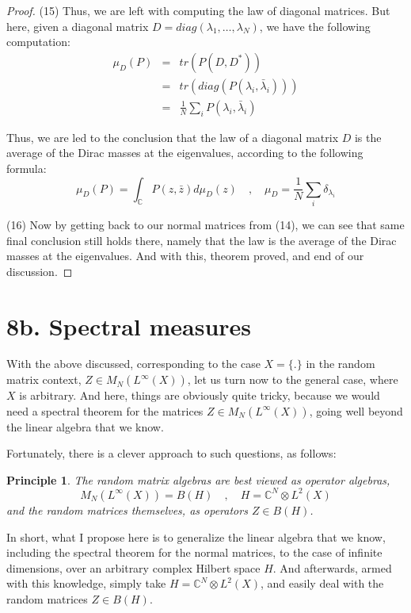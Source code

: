 \documentclass[12pt]{amsbook}
\newtheorem{principle}[theorem]{Principle}
\begin{document}
\begin{proof}
(15) Thus, we are left with computing the law of diagonal matrices. But here, given a diagonal matrix $D=diag(\lambda_1,\ldots,\lambda_N)$, we have the following computation:
\begin{eqnarray*}
\mu_D(P)
&=&tr(P(D,D^*))\\
&=&tr(diag(P(\lambda_i,\bar{\lambda}_i)))\\
&=&\frac{1}{N}\sum_iP(\lambda_i,\bar{\lambda}_i)
\end{eqnarray*}

Thus, we are led to the conclusion that the law of a diagonal matrix $D$ is the average of the Dirac masses at the eigenvalues, according to the following formula:
$$\mu_D(P)=\int_\mathbb CP(z,\bar{z})d\mu_D(z)\quad,\quad\mu_D=\frac{1}{N}\sum_i\delta_{\lambda_i}$$

(16) Now by getting back to our normal matrices from (14), we can see that same final conclusion still holds there, namely that the law is the average of the Dirac masses at the eigenvalues. And with this, theorem proved, and end of our discussion.
\end{proof}

\section*{8b. Spectral measures}

With the above discussed, corresponding to the case $X=\{.\}$ in the random matrix context, $Z\in M_N(L^\infty(X))$, let us turn now to the general case, where $X$ is arbitrary. And here, things are obviously quite tricky, because we would need a spectral theorem for the matrices $Z\in M_N(L^\infty(X))$, going well beyond the linear algebra that we know.

\bigskip

Fortunately, there is a clever approach to such questions, as follows:

\begin{principle}
The random matrix algebras are best viewed as operator algebras,
$$M_N(L^\infty(X))=B(H)\quad,\quad H=\mathbb C^N\otimes L^2(X)$$
and the random matrices themselves, as operators $Z\in B(H)$.
\end{principle}

In short, what I propose here is to generalize the linear algebra that we know, including the spectral theorem for the normal matrices, to the case of infinite dimensions, over an arbitrary complex Hilbert space $H$. And afterwards, armed with this knowledge, simply take $H=\mathbb C^N\otimes L^2(X)$, and easily deal with the random matrices $Z\in B(H)$.
\end{document}
